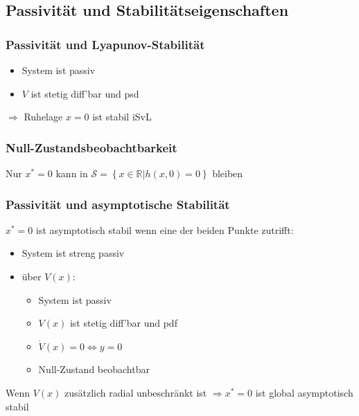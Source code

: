 \documentclass[german]{latex4ei/latex4ei_sheet}
\begin{document}
\begin{sectionbox}
\subsection{Passivität und Stabilitätseigenschaften}

\subsubsection{Passivität und Lyapunov-Stabilität}
\begin{itemize}
  \item System ist passiv
  \item $V$ ist stetig diff'bar und psd
\end{itemize}
$\Rightarrow$ Ruhelage $x=0$ ist stabil iSvL

\subsubsection{Null-Zustandsbeobachtbarkeit}
Nur $x^*=0$ kann in $\mathcal{S} = \left\{ x \in \mathbb{R} | h(x,0)=0 \right\}$ bleiben

\subsubsection{Passivität und asymptotische Stabilität}
$x^*=0$ ist asymptotisch stabil wenn eine der beiden Punkte zutrifft:
\begin{itemize}
  \item System ist streng passiv
  \item über $V(x)$:
    \begin{itemize}
      \item System ist passiv
      \item $V(x)$ ist stetig diff'bar und pdf
      \item $\dot{V}(x) = 0 \Leftrightarrow y = 0$
      \item Null-Zustand beobachtbar
    \end{itemize}
\end{itemize}

Wenn $V(x)$ zusätzlich radial unbeschränkt ist $\Rightarrow x^* = 0$ ist global asymptotisch stabil
\end{sectionbox}
\end{document}
